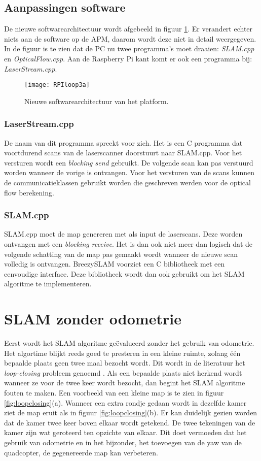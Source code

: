 \subsection{Aanpassingen software}
De nieuwe softwarearchitectuur wordt afgebeeld in figuur \ref{fig:RPIloop3a}. Er verandert echter niets aan de software op de APM, daarom wordt deze niet in detail weergegeven. In de figuur is te zien dat de PC nu twee programma's moet draaien: \textit{SLAM.cpp} en \textit{OpticalFlow.cpp}. Aan de Raspberry Pi kant komt er ook een programma bij: \textit{LaserStream.cpp}.

\begin{figure}[h]
	\centering
	\texttt{[image: RPIloop3a]}
	\caption{Nieuwe softwarearchitectuur van het platform.}\label{fig:RPIloop3a}
\end{figure}

\subsubsection{LaserStream.cpp}
De naam van dit programma spreekt voor zich. Het is een C programma dat voortdurend scans van de laserscanner doorstuurt naar SLAM.cpp. Voor het versturen wordt een \textit{blocking send} gebruikt. De volgende scan kan pas verstuurd worden wanneer de vorige is ontvangen. Voor het versturen van de scans kunnen de communicatieklassen gebruikt worden die geschreven werden voor de optical flow berekening.

\subsubsection{SLAM.cpp}
SLAM.cpp moet de map genereren met als input de laserscans. Deze worden ontvangen met een \textit{blocking receive}. Het is dan ook niet meer dan logisch dat de volgende schatting van de map pas gemaakt wordt wanneer de nieuwe scan volledig is ontvangen. BreezySLAM voorziet een C bibliotheek met een eenvoudige interface. Deze bibliotheek wordt dan ook gebruikt om het SLAM algoritme te implementeren.

\section{SLAM zonder odometrie}
Eerst wordt het SLAM algoritme ge\"evalueerd zonder het gebruik van odometrie. Het algortime blijkt reeds goed te presteren in een kleine ruimte, zolang \'e\'en bepaalde plaats geen twee maal bezocht wordt. Dit wordt in de literatuur het \textit{loop-closing} probleem genoemd \cite{book:SLAMHandbook}. Als een bepaalde plaats niet herkend wordt wanneer ze voor de twee keer wordt bezocht, dan begint het SLAM algoritme fouten te maken. Een voorbeeld van een kleine map is te zien in figuur \ref{fig:loopclosing}(a). Wanneer een extra rondje gedaan wordt in dezelfde kamer ziet de map eruit als in figuur \ref{fig:loopclosing}(b). Er kan duidelijk gezien worden dat de kamer twee keer boven elkaar wordt getekend. De twee tekeningen van de kamer zijn wat geroteerd ten opzichte van elkaar. Dit doet vermoeden dat het gebruik van odometrie en in het bijzonder, het toevoegen van de yaw van de quadcopter, de gegenereerde map kan verbeteren.

